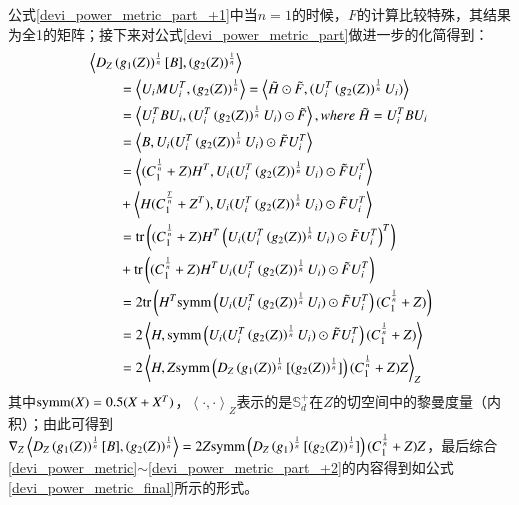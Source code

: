 公式\ref{devi_power_metric_part_+1}中当$n=1$的时候，$F$的计算比较特殊，其结果为全1的矩阵；接下来对公式\ref{devi_power_metric_part}做进一步的化简得到：
\begin{equation}
\label{devi_power_metric_part_+2}
\begin{split}
&\left<D_{Z}\left(g_{1}(Z)\right)^{\frac{1}{n}}[B],\left(g_{2}(Z)\right)^{\frac{1}{n}}\right>\\
&~~~~~~~~~=\left<U_{i}MU_{i}^{T},\left(g_{2}(Z)\right)^{\frac{1}{n}}\right>=\left<\tilde{H}\odot\tilde{F},(U_{i}^{T}\left(g_{2}(Z)\right)^{\frac{1}{n}}U_{i})\right>\\
&~~~~~~~~~=\left<U_{i}^{T}BU_{i},(U_{i}^{T}\left(g_{2}(Z)\right)^{\frac{1}{n}}U_{i})\odot\tilde{F}\right>,where~\tilde{H}=U_{i}^{T}BU_{i}\\
&~~~~~~~~~=\left<B,U_{i}(U_{i}^{T}\left(g_{2}(Z)\right)^{\frac{1}{n}}U_{i})\odot\tilde{F}U_{i}^{T}\right>\\
&~~~~~~~~~=\left<(C_{1}^{\frac{1}{n}}+Z)H^{T},U_{i}(U_{i}^{T}\left(g_{2}(Z)\right)^{\frac{1}{n}}U_{i})\odot\tilde{F}U_{i}^{T}\right>\\
&~~~~~~~~~+\left<H(C_{1}^{\frac{T}{n}}+Z^{T}),U_{i}(U_{i}^{T}\left(g_{2}(Z)\right)^{\frac{1}{n}}U_{i})\odot\tilde{F}U_{i}^{T}\right>\\
&~~~~~~~~~={\rm tr}\left((C_{1}^{\frac{1}{n}}+Z)H^{T}\left(U_{i}(U_{i}^{T}\left(g_{2}(Z)\right)^{\frac{1}{n}}U_{i})\odot\tilde{F}U_{i}^{T}\right)^{T}\right)\\
&~~~~~~~~~+{\rm tr}\left((C_{1}^{\frac{1}{n}}+Z)H^{T}U_{i}(U_{i}^{T}\left(g_{2}(Z)\right)^{\frac{1}{n}}U_{i})\odot\tilde{F}U_{i}^{T}\right)\\
&~~~~~~~~~=2{\rm tr}\left(H^{T}{\rm symm}\left(U_{i}(U_{i}^{T}\left(g_{2}(Z)\right)^{\frac{1}{n}}U_{i})\odot\tilde{F}U_{i}^{T}\right)(C_{1}^{\frac{1}{n}}+Z)\right)\\
&~~~~~~~~~=2\left<H,{\rm symm}\left(U_{i}(U_{i}^{T}\left(g_{2}(Z)\right)^{\frac{1}{n}}U_{i})\odot\tilde{F}U_{i}^{T}\right)(C_{1}^{\frac{1}{n}}+Z)\right>\\
&~~~~~~~~~=2\left<H,Z{\rm symm}\left(D_{Z}\left(g_{1}(Z)\right)^{\frac{1}{n}}[\left(g_{2}(Z)\right)^{\frac{1}{n}}]\right)(C_{1}^{\frac{1}{n}}+Z)Z\right>_Z\\
\end{split}
\end{equation}
其中${\rm symm}(X)=0.5(X+X^{T})$，$\left<\cdot,\cdot\right>_Z$表示的是$\mathbb{S}_{d}^{+}$在$Z$的切空间中的黎曼度量（内积）；由此可得到$\nabla_{Z}\left<D_{Z}\left(g_{1}(Z)\right)^{\frac{1}{n}}[B],\left(g_{2}(Z)\right)^{\frac{1}{n}}\right>=2Z{\rm symm}\left(D_{Z}\left(g_{1}\right)^{\frac{1}{n}}[\left(g_{2}(Z)\right)^{\frac{1}{n}}]\right)(C_{1}^{\frac{1}{n}}+Z)Z$，最后综合\ref{devi_power_metric}$\sim$\ref{devi_power_metric_part_+2}的内容得到如公式\ref{devi_power_metric_final}所示的形式。

